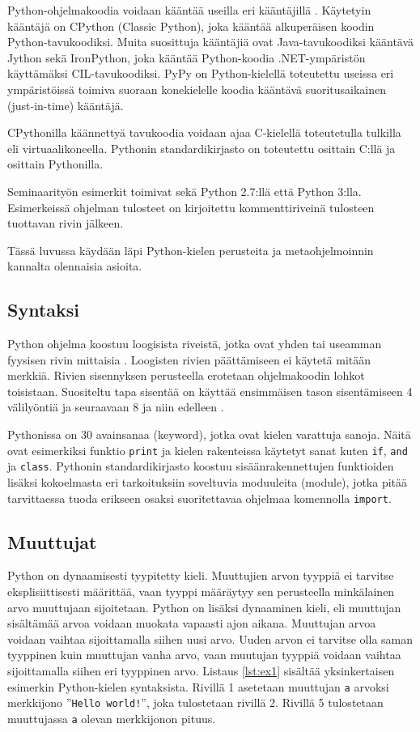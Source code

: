 \documentclass[finnish]{tktltiki2}
\theoremstyle{definition}
\theoremstyle{remark}
\begin{document}
Python-ohjelmakoodia voidaan kääntää useilla eri kääntäjillä \cite[s. 5]{martelli2006python}. Käytetyin kääntäjä on CPython (Classic Python), joka kääntää alkuperäisen koodin Python-tavukoodiksi. Muita suosittuja kääntäjiä ovat Java-tavukoodiksi kääntävä Jython sekä IronPython, joka kääntää Python-koodia .NET-ympäristön käyttämäksi CIL-tavukoodiksi. PyPy on Python-kielellä toteutettu useissa eri ympäristöissä toimiva suoraan konekielelle koodia kääntävä suoritusaikainen (just-in-time) kääntäjä. %

CPythonilla käännettyä tavukoodia voidaan ajaa C-kielellä toteutetulla tulkilla \cite[s. 22]{martelli2006python} eli virtuaalikoneella. Pythonin standardikirjasto on toteutettu osittain C:llä ja osittain Pythonilla.

Seminaarityön esimerkit toimivat sekä Python 2.7:llä että Python 3:lla. Esimerkeissä ohjelman tulosteet on kirjoitettu kommenttiriveinä tulosteen tuottavan rivin jälkeen.

Tässä luvussa käydään läpi Python-kielen perusteita ja metaohjelmoinnin kannalta olennaisia asioita.

\subsection{Syntaksi}

Python ohjelma koostuu loogisista riveistä, jotka ovat yhden tai useamman fyysisen rivin mittaisia \cite[s. 33]{martelli2006python}. Loogisten rivien päättämiseen ei käytetä mitään merkkiä. Rivien sisennyksen perusteella erotetaan ohjelmakoodin lohkot toisistaan. Suositeltu tapa sisentää on käyttää ensimmäisen tason sisentämiseen 4 välilyöntiä ja seuraavaan 8 ja niin edelleen \cite{pep8}. 

Pythonissa on 30 avainsanaa (keyword), jotka ovat kielen varattuja sanoja. Näitä ovat esimerkiksi funktio \verb|print| ja kielen rakenteissa käytetyt sanat kuten \verb|if|, \verb|and| ja \verb|class|. Pythonin standardikirjasto koostuu sisäänrakennettujen funktioiden lisäksi kokoelmasta eri tarkoituksiin soveltuvia moduuleita (module), jotka pitää tarvittaessa tuoda erikseen osaksi suoritettavaa ohjelmaa komennolla \verb|import|.

\subsection{Muuttujat}

Python on dynaamisesti tyypitetty kieli. Muuttujien arvon tyyppiä ei tarvitse eksplisiittisesti määrittää, vaan tyyppi määräytyy sen perusteella minkälainen arvo muuttujaan sijoitetaan. Python on lisäksi dynaaminen kieli, eli muuttujan sisältämää arvoa voidaan muokata vapaasti ajon aikana. Muuttujan arvoa voidaan vaihtaa sijoittamalla siihen uusi arvo. Uuden arvon ei tarvitse olla saman tyyppinen kuin muuttujan vanha arvo, vaan muutujan tyyppiä voidaan vaihtaa sijoittamalla siihen eri tyyppinen arvo. Listaus \ref{lst:ex1} sisältää yksinkertaisen esimerkin Python-kielen syntaksista. Rivillä 1 asetetaan muuttujan \verb|a| arvoksi merkkijono ''\verb|Hello world!|'', joka tulostetaan rivillä 2. Rivillä 5 tulostetaan muuttujassa \verb|a| olevan merkkijonon pituus.
\end{document}
